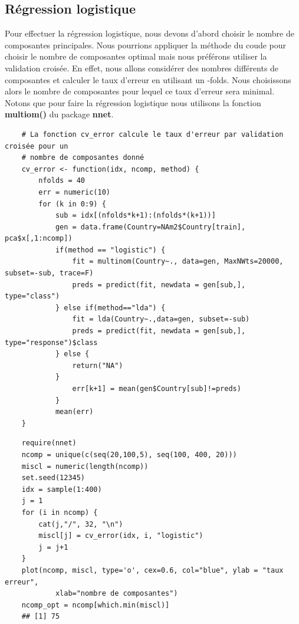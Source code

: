 \documentclass[12pt,a4paper]{article}
\begin{document}
\subsection{Régression logistique} 
Pour effectuer la régression logistique, nous devons d'abord choisir le nombre de composantes principales. Nous pourrions appliquer la méthode du \og coude \fg pour choisir le nombre de composantes optimal mais nous préférons utiliser la validation croisée. En effet, nous allons considérer des nombres différents de composantes et calculer le taux d'erreur en utilisant un -folds\fg. Nous choisissons alors le nombre de composantes pour lequel ce taux d'erreur sera minimal.\\
Notons que pour faire la régression logistique nous utilisons la fonction \textbf{multiom()} du package \textbf{nnet}.\vspace{2mm}
\begin{lstlisting}
	# La fonction cv_error calcule le taux d'erreur par validation croisée pour un 
	# nombre de composantes donné
	cv_error <- function(idx, ncomp, method) {
		nfolds = 40
		err = numeric(10)
		for (k in 0:9) {
			sub = idx[(nfolds*k+1):(nfolds*(k+1))]
			gen = data.frame(Country=NAm2$Country[train], pca$x[,1:ncomp])
			if(method == "logistic") {
				fit = multinom(Country~., data=gen, MaxNWts=20000, subset=-sub, trace=F)
				preds = predict(fit, newdata = gen[sub,], type="class")
			} else if(method=="lda") {
				fit = lda(Country~.,data=gen, subset=-sub)
				preds = predict(fit, newdata = gen[sub,], type="response")$class
			} else {
				return("NA")
			}
				err[k+1] = mean(gen$Country[sub]!=preds)
			}
			mean(err)
	}
\end{lstlisting}
\begin{lstlisting}
	require(nnet)
	ncomp = unique(c(seq(20,100,5), seq(100, 400, 20)))
	miscl = numeric(length(ncomp))
	set.seed(12345)
	idx = sample(1:400)
	j = 1
	for (i in ncomp) {
		cat(j,"/", 32, "\n")
		miscl[j] = cv_error(idx, i, "logistic")
		j = j+1
	}
	plot(ncomp, miscl, type='o', cex=0.6, col="blue", ylab = "taux erreur",
			xlab="nombre de composantes")
	ncomp_opt = ncomp[which.min(miscl)]
	## [1] 75
\end{lstlisting}
\end{document}
